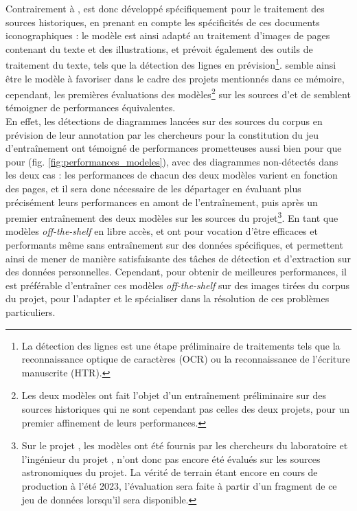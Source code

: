   	Contrairement à \yolov, \docex est donc développé spécifiquement pour le traitement des sources historiques, en prenant en compte les spécificités de ces documents iconographiques : le modèle est ainsi adapté au traitement d'images de pages contenant du texte et des illustrations, et prévoit également des outils de traitement du texte, tels que la détection des lignes en prévision\footnote{La détection des lignes est une étape préliminaire de traitements tels que la reconnaissance optique de caractères (OCR) ou la reconnaissance de l'écriture manuscrite (HTR).}. \docex semble ainsi être le modèle à favoriser dans le cadre des projets mentionnés dans ce mémoire, cependant, les premières évaluations des modèles\footnote{Les deux modèles ont fait l'objet d'un entraînement préliminaire sur des sources historiques qui ne sont cependant pas celles des deux projets, pour un premier affinement de leurs performances.} sur les sources d'\eida et de \vhs semblent témoigner de performances équivalentes.\\
   	
   	En effet, les détections de diagrammes lancées sur des sources du corpus \eida en prévision de leur annotation par les chercheurs pour la constitution du jeu d'entraînement ont témoigné de performances prometteuses aussi bien pour \docex que pour \yolov  (fig. \ref{fig:performances_modeles}), avec des diagrammes non-détectés dans les deux cas : les performances de chacun des deux modèles varient en fonction des pages, et il sera donc nécessaire de les départager en évaluant plus précisément leurs performances en amont de l'entraînement, puis après un premier entraînement des deux modèles sur les sources du projet\footnote{Sur le projet \eida, les modèles ont été fournis par les chercheurs du laboratoire \imagine et l'ingénieur du projet \vhs, n'ont donc pas encore été évalués sur les sources astronomiques du projet. La vérité de terrain étant encore en cours de production à l'été 2023, l'évaluation sera faite à partir d'un fragment de ce jeu de données lorsqu'il sera disponible.}. En tant que modèles \textit{off-the-shelf} en libre accès, \yolov et \docex ont pour vocation d'être efficaces et performants même sans entraînement sur des données spécifiques, et permettent ainsi de mener de manière satisfaisante des tâches de détection et d'extraction sur des données personnelles. Cependant, pour obtenir de meilleures performances, il est préférable d'entraîner ces modèles \textit{off-the-shelf} sur des images tirées du corpus du projet, pour l'adapter et le spécialiser dans la résolution de ces problèmes particuliers.
   	
